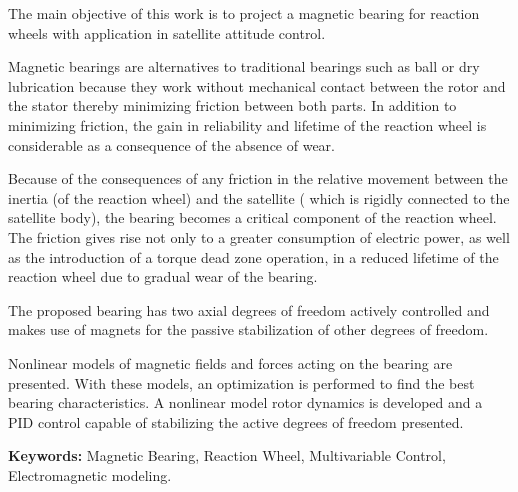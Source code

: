The main objective of this work is to project a magnetic bearing for reaction wheels with application in satellite attitude control.


Magnetic bearings are alternatives to traditional bearings such as ball or dry lubrication because they work without mechanical contact between the rotor and the stator thereby minimizing friction between both parts. In addition to minimizing friction, the gain in reliability and lifetime of the reaction wheel is considerable as a consequence of the absence of wear.

Because of the consequences of any friction in the relative movement between the inertia (of the reaction wheel) and the satellite ( which is rigidly connected to the satellite body), the bearing becomes a critical component of the reaction wheel. The friction gives rise not only to a greater consumption of electric power, as well as the introduction of a torque dead zone operation,  in a reduced lifetime of the reaction wheel due to gradual wear of the bearing.

The proposed bearing has two axial degrees of freedom actively controlled and makes use of magnets for the passive stabilization of other degrees of freedom.

Nonlinear models of magnetic fields and forces acting on the bearing are presented. With these models, an optimization is performed to find the best bearing characteristics. A nonlinear model rotor dynamics is developed and a PID control capable of stabilizing the active degrees of freedom presented.


\par
\vspace{1em}
\noindent\textbf{Keywords:} Magnetic Bearing, Reaction Wheel, Multivariable Control, Electromagnetic modeling.

\normalsize 


\newpage


\listoffigures

\listoftables


\tableofcontents

